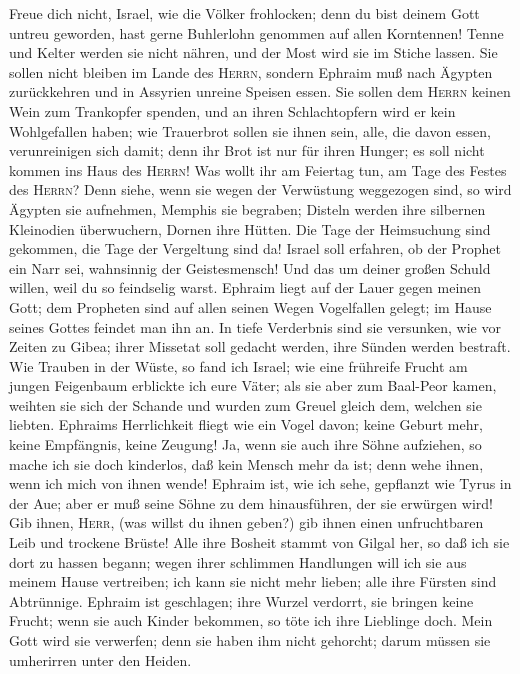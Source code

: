  Freue dich nicht, Israel, wie die Völker frohlocken; denn
du bist deinem Gott untreu geworden, hast gerne Buhlerlohn genommen auf
allen Korntennen!  Tenne und Kelter werden sie nicht
nähren, und der Most wird sie im Stiche lassen.  Sie
sollen nicht bleiben im Lande des \textsc{Herrn}, sondern Ephraim muß
nach Ägypten zurückkehren und in Assyrien unreine Speisen essen.
 Sie sollen dem \textsc{Herrn} keinen Wein zum Trankopfer
spenden, und an ihren Schlachtopfern wird er kein Wohlgefallen haben;
wie Trauerbrot sollen sie ihnen sein, alle, die davon essen,
verunreinigen sich damit; denn ihr Brot ist nur für ihren Hunger; es
soll nicht kommen ins Haus des \textsc{Herrn}!  Was wollt
ihr am Feiertag tun, am Tage des Festes des \textsc{Herrn}?
 Denn siehe, wenn sie wegen der Verwüstung weggezogen
sind, so wird Ägypten sie aufnehmen, Memphis sie begraben; Disteln
werden ihre silbernen Kleinodien überwuchern, Dornen ihre Hütten.
 Die Tage der Heimsuchung sind gekommen, die Tage der
Vergeltung sind da! Israel soll erfahren, ob der Prophet ein Narr sei,
wahnsinnig der Geistesmensch! Und das um deiner großen Schuld willen,
weil du so feindselig warst.  Ephraim liegt auf der Lauer
gegen meinen Gott; dem Propheten sind auf allen seinen Wegen Vogelfallen
gelegt; im Hause seines Gottes feindet man ihn an.  In
tiefe Verderbnis sind sie versunken, wie vor Zeiten zu Gibea; ihrer
Missetat soll gedacht werden, ihre Sünden werden bestraft.
 Wie Trauben in der Wüste, so fand ich Israel; wie eine
frühreife Frucht am jungen Feigenbaum erblickte ich eure Väter; als sie
aber zum Baal-Peor kamen, weihten sie sich der Schande und wurden zum
Greuel gleich dem, welchen sie liebten.  Ephraims
Herrlichkeit fliegt wie ein Vogel davon; keine Geburt mehr, keine
Empfängnis, keine Zeugung!  Ja, wenn sie auch ihre Söhne
aufziehen, so mache ich sie doch kinderlos, daß kein Mensch mehr da ist;
denn wehe ihnen, wenn ich mich von ihnen wende!  Ephraim
ist, wie ich sehe, gepflanzt wie Tyrus in der Aue; aber er muß seine
Söhne zu dem hinausführen, der sie erwürgen wird!  Gib
ihnen, \textsc{Herr}, (was willst du ihnen geben?) gib ihnen einen
unfruchtbaren Leib und trockene Brüste!  Alle ihre
Bosheit stammt von Gilgal her, so daß ich sie dort zu hassen begann;
wegen ihrer schlimmen Handlungen will ich sie aus meinem Hause
vertreiben; ich kann sie nicht mehr lieben; alle ihre Fürsten sind
Abtrünnige.  Ephraim ist geschlagen; ihre Wurzel
verdorrt, sie bringen keine Frucht; wenn sie auch Kinder bekommen, so
töte ich ihre Lieblinge doch.  Mein Gott wird sie
verwerfen; denn sie haben ihm nicht gehorcht; darum müssen sie
umherirren unter den Heiden.


